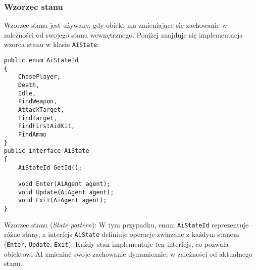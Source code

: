 \subsubsection{Wzorzec stanu}\label{subsubsec:state}
Wzorzec stanu jest używany, gdy obiekt ma zmieniające się zachowanie w zależności od swojego stanu wewnętrznego. Poniżej znajduje się implementacja wzorca stanu w klasie \texttt{AiState}:
\begin{codebox}
\begin{lstlisting}[language={[Sharp]C}, label={listing:AiState.cs}]
public enum AiStateId
{
    ChasePlayer,
    Death,
    Idle,
    FindWeapon,
    AttackTarget,
    FindTarget,
    FindFirstAidKit,
    FindAmmo
}
public interface AiState
{
    AiStateId GetId();

    void Enter(AiAgent agent);
    void Update(AiAgent agent);
    void Exit(AiAgent agent);
}
\end{lstlisting}
\end{codebox}
Wzorzec stanu (\textit{State pattern}): W tym przypadku, enum \texttt{AiStateId} reprezentuje różne stany, a interfejs \texttt{AiState} definiuje operacje związane z każdym stanem (\texttt{Enter}, \texttt{Update}, \texttt{Exit}). Każdy stan implementuje ten interfejs, co pozwala obiektowi AI zmieniać swoje zachowanie dynamicznie, w zależności od aktualnego stanu.

